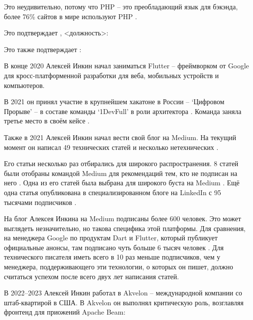 Это неудивительно, потому что PHP -- это преобладающий язык для бэкэнда,
более 76\% сайтов в мире используют PHP .

Это подтверждает \MrPhpOne, <должность>:


Это также подтверждает \MrPhpTwoT:


В конце 2020 Алексей Инкин начал заниматься Flutter -- фреймворком от Google для кросс-платформенной
разработки для веба, мобильных устройств и компьютеров.

В 2021 он принял участие в крупнейшем хакатоне в России -- `Цифровом Прорыве' --
в составе команды `1DevFull' в роли архитектора .
Команда заняла третье место в своём кейсе .

Также в 2021 Алексей Инкин начал вести свой блог на Medium.
На текущий момент он написал 49 технических статей
и несколько нетехнических
.

Его статьи несколько раз отбирались для широкого распространения.
8 статей были отобраны командой Medium для рекомендаций тем, кто не подписан на него .
Одна из его статей была выбрана для широкого буста на Medium .
Ещё одна статья опубликована в специализированном блоге на LinkedIn с 95 тысячами подписчиков .

На блог Алексея Инкина на Medium подписаны более 600 человек.
Это может выглядеть незначительно, но такова специфика этой платформы.
Для сравнения, на менеджера Google по продуктам Dart и Flutter,
который публикует официальные анонсы, там подписано чуть больше 6 тысяч человек
.
Для технического писателя иметь всего в 10 раз меньше подписчиков,
чем у менеджера, поддерживающего эти технологии,
о которых он пишет, должно считаться успехом после всего двух лет написания статей.

В 2022--2023 Алексей Инкин работал в Akvelon -- международной компании со штаб-квартирой в США.
В Akvelon он выполнял критическую роль,
возглавляя фронтенд для приожений Apache Beam:

